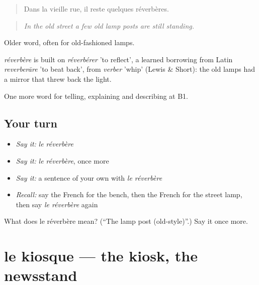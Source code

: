 \begin{quote}
Dans la vieille rue, il reste quelques réverbères.
\end{quote}

\begin{quote}
\emph{In the old street a few old lamp posts are still standing.}
\end{quote}

Older word, often for old-fashioned lamps.

\begin{cousinweb}
\emph{réverbère} is built on \emph{réverbérer} 'to reflect', a learned borrowing from Latin \emph{reverberāre} 'to beat back', from \emph{verber} 'whip' (Lewis \& Short): the old lamps had a mirror that threw back the light.
\end{cousinweb}

\begin{grammarlens}[title={What you've built}]
One more word for telling, explaining and describing at B1.
\end{grammarlens}

\subsection*{Your turn}
\begin{itemize}
\raggedright
  \item \emph{Say it:} \emph{le réverbère}
  \item \emph{Say it:} \emph{le réverbère}, once more
  \item \emph{Say it:} a sentence of your own with \emph{le réverbère}
  \item \emph{Recall:} say the French for the bench, then the French for the street lamp, then say \emph{le réverbère} again
\end{itemize}

\begin{tcolorbox}[breakable,colback=teal!4,colframe=teal!35!black,title={Before you move on}]
What does le réverbère mean? (\textquotedblleft{}The lamp post (old-style)\textquotedblright{}.) Say it once more.
\end{tcolorbox}
\section[le kiosque]{le kiosque — the kiosk, the newsstand}

\label{lesson:FR-C441-kiosque}



